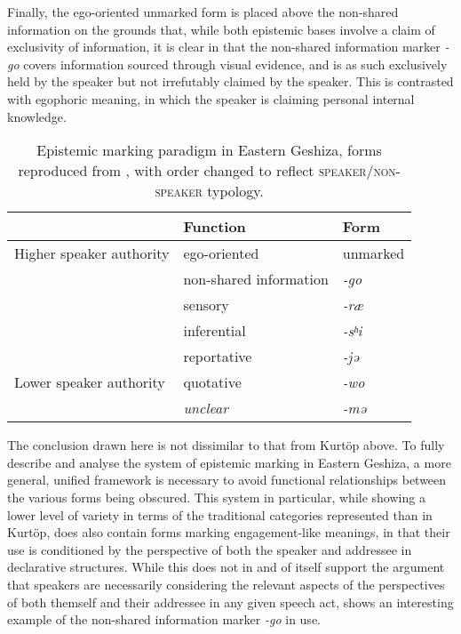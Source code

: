 Finally, the ego-oriented unmarked form is placed above the non-shared information on the grounds that, while both epistemic bases involve a claim of exclusivity of information, it is clear in  that the non-shared information marker \textit{-go} covers information sourced through visual evidence, and is as such exclusively held by the speaker but not irrefutably claimed by the speaker. This is contrasted with egophoric meaning, in which the speaker is claiming personal internal knowledge.

\begin{table}
    \caption{Epistemic marking paradigm in Eastern Geshiza, forms reproduced from \cite[584]{Honkasalo2019}, with order changed to reflect \textsc{speaker/non-speaker} typology.}\label{t:Discussion:EasternGeshiza}
    \begin{tabular}{|l|l|l|}
        \hline
                                 & Function               & Form          \\ \hline
        Higher speaker authority & ego-oriented           & unmarked      \\
                                 & non-shared information & \textit{-go}  \\
                                 & sensory                & \textit{-ræ}  \\
                                 & inferential            & \textit{-sʰi} \\
                                 & reportative            & \textit{-jə}  \\
        Lower speaker authority  & quotative              & \textit{-wo}  \\ \hline
                                 & \textit{unclear}       & \textit{-mə}  \\ \hline
    \end{tabular}
\end{table}

The conclusion drawn here is not dissimilar to that from Kurtöp above. To fully describe and analyse the system of epistemic marking in Eastern Geshiza, a more general, unified framework is necessary to avoid functional relationships between the various forms being obscured. This system in particular, while showing a lower level of variety in terms of the traditional categories represented than in Kurtöp, does also contain forms marking engagement-like meanings, in that their use is conditioned by the perspective of both the speaker and addressee in declarative structures. While this does not in and of itself support the argument that speakers are necessarily considering the relevant aspects of the perspectives of both themself and their addressee in any given speech act,  shows an interesting example of the non-shared information marker \textit{-go} in use.

